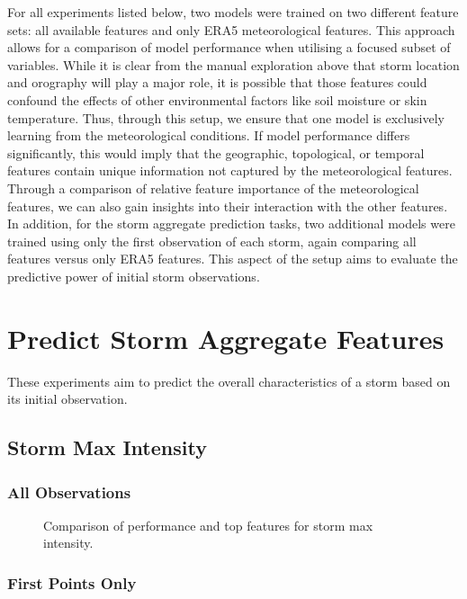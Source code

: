 For all experiments listed below, two models were trained on two different feature sets: all available features and only ERA5 meteorological features. This approach allows for a comparison of model performance when utilising a focused subset of variables. While it is clear from the manual exploration above that storm location and orography will play a major role, it is possible that those features could confound the effects of other environmental factors like soil moisture or skin temperature. Thus, through this setup, we ensure that one model is exclusively learning from the meteorological conditions. If model performance differs significantly, this would imply that the geographic, topological, or temporal features contain unique information not captured by the meteorological features. Through a comparison of relative feature importance of the meteorological features, we can also gain insights into their interaction with the other features. In addition, for the storm aggregate prediction tasks, two additional models were trained using only the first observation of each storm, again comparing all features versus only ERA5 features. This aspect of the setup aims to evaluate the predictive power of initial storm observations.

\section{Predict Storm Aggregate Features}

These experiments aim to predict the overall characteristics of a storm based on its initial observation.

\subsection{Storm Max Intensity}

\subsubsection{All Observations}

\begin{figure}[h]
    \centering
    \caption{Comparison of performance and top features for storm max intensity.}
    \label{fig:storm_max_intensity_summary}
\end{figure}

\subsubsection{First Points Only}

